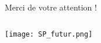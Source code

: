 


\section*{}

\begin{frame}

\begin{columns}

	\begin{column}{.5\textwidth}

	\begin{center}
	\begin{block}{}
	\centering \large Merci de votre attention ! {\Large \smiley}
	\end{block}
	\end{center}

	\end{column}


\end{columns}


\begin{center}
\texttt{[image: SP\_futur.png]} \tiny \cite{SP_futur}
\end{center}

\end{frame}
